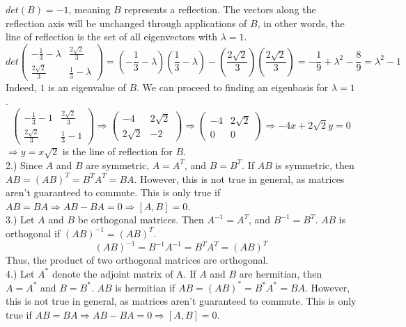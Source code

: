 \documentclass[12pt]{article}
\begin{document}
$det(B) = -1$, meaning $B$ represents a reflection. The vectors along the reflection axis will be unchanged through applications of $B$, in other words, the line of reflection is the set of all eigenvectors with $\lambda = 1$.
$$det \begin{pmatrix} -\frac{1}{3} - \lambda & \frac{2 \sqrt{2}}{3}\\ \frac{2 \sqrt{2}}{3} & \frac{1}{3} - \lambda \end{pmatrix} = (-\frac{1}{3} - \lambda)(\frac{1}{3} - \lambda) - (\frac{2 \sqrt{2}}{3})(\frac{2 \sqrt{2}}{3}) = -\frac{1}{9} + \lambda^2 - \frac{8}{9} = \lambda^2 - 1$$
Indeed, $1$ is an eigenvalue of $B$. We can proceed to finding an eigenbasis for $\lambda = 1$.
$$\begin{pmatrix} -\frac{1}{3} - 1 & \frac{2 \sqrt{2}}{3}\\ \frac{2 \sqrt{2}}{3} & \frac{1}{3} - 1 \end{pmatrix} \Rightarrow \begin{pmatrix} -4 & 2 \sqrt{2}\\ 2 \sqrt{2} & -2 \end{pmatrix} \Rightarrow \begin{pmatrix} -4 & 2 \sqrt{2} \\ 0 & 0\end{pmatrix} \Rightarrow -4x + 2 \sqrt{2} y = 0$$
$\Rightarrow y = x \sqrt{2}$ is the line of reflection for $B$.\\

2.) Since $A$ and $B$ are symmetric, $A = A^T$, and $B = B^T$. If $AB$ is symmetric, then $AB = (AB)^T = B^TA^T = BA$. However, this is not true in general, as matrices aren't guaranteed to commute. This is only true if $AB = BA \Rightarrow AB - BA = 0 \Rightarrow [A, B] = 0$.\\

3.) Let $A$ and $B$ be orthogonal matrices. Then $A^{-1} = A^T$, and $B^{-1} = B^T$. $AB$ is orthogonal if $(AB)^{-1} = (AB)^{T}$. 
$$(AB)^{-1} = B^{-1}A^{-1} = B^TA^T = (AB)^T$$
Thus, the product of two orthogonal matrices are orthogonal.\\

4.) Let $A^{*}$ denote the adjoint matrix of A. If $A$ and $B$ are hermitian, then $A = A^{*}$ and $B = B^{*}$. $AB$ is hermitian if $AB = (AB)^* = B^*A^* = BA$. However, this is not true in general, as matrices aren't guaranteed to commute. This is only true if $AB = BA \Rightarrow AB - BA = 0 \Rightarrow [A, B] = 0$.\\
\end{document}

